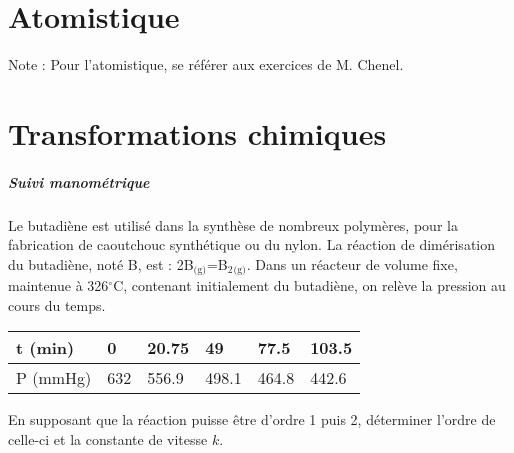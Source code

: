 \documentclass[a4paper, 11pt, french]{article}
\begin{document}
\begin{figure}[h]
  \centering
\end{figure}

	\section*{Atomistique}
		Note : Pour l'atomistique, se référer aux exercices de M. Chenel.

	\section*{Transformations chimiques}
		\subparagraph{Suivi manométrique \\}
	Le butadiène est utilisé dans la synthèse de nombreux polymères, pour la fabrication de caoutchouc synthétique ou du nylon. La réaction de dimérisation du butadiène, noté B, est : 2B$_{\text{(g)}}$=B$_2{_{\text{(g)}}}$. Dans un réacteur de volume fixe, maintenue à 326$^\circ$C, contenant initialement du butadiène, on relève la pression au cours du temps. 
	\begin{center}
		\begin{tabular}{|l|l|l|l|l|l|}
			\hline t (min) & 0 & 20.75 & 49 & 77.5 & 103.5 \\
			\hline P (mmHg) & 632 & 556.9 & 498.1 & 464.8 & 442.6 \\
			\hline
		\end{tabular}
	\end{center}
	En supposant que la réaction puisse être d'ordre 1 puis 2, déterminer l'ordre de celle-ci et la constante de vitesse $k$.
\end{document}
